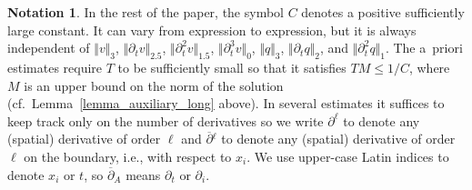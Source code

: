 \documentclass[10pt,reqno]{amsart}
\theoremstyle{plain}
\theoremstyle{definition}
\newtheorem{notation}[theorem]{Notation}
\numberwithin{equation}{section}
\newcommand{\norm}[1]{\Vert#1\Vert}
\begin{document}
\begin{notation}
In the rest of the paper, the symbol $C$ denotes a positive sufficiently large
constant.
It can vary 
from expression to expression, but it is always  independent of 
$\norm{v}_3$, $\norm{\partial_t v}_{2.5}$, $\norm{\partial^2_t v}_{1.5}$,
$\norm{\partial^3_t v}_0$, $\norm{q}_3$,
$\norm{\partial_t q}_{2}$, and $\norm{\partial^2_t q}_1$.
The a~priori estimates require $T$ to be sufficiently small so
that it satisfies
$T M\le 1/C$, where $M$ is an upper bound on the norm of the solution
(cf.~Lemma~\ref{lemma_auxiliary_long} above).
In several estimates it suffices to keep track only on the number of derivatives so we 
write $\partial^\ell$ to denote any (spatial) derivative of order $\ell$ and $\overline{\partial}{}^\ell$
to denote any (spatial) derivative of order $\ell$ on the boundary, i.e., with respect to $x_i$.
We use upper-case Latin indices to denote $x_i$ or $t$, so $\overline{\partial}_A$
means $\partial_t$ or $\partial_i$.
\end{notation}
\end{document}
